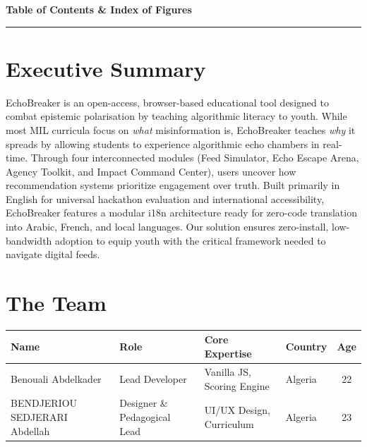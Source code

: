 \documentclass[11pt, a4paper]{article}
\begin{document}
\newpage
{}

\begin{center}
  {\large\bfseries\color{echored} Table of Contents \& Index of Figures}
\end{center}
\vspace{-4pt}

\tableofcontents

\vspace{12pt}
\textcolor{echoborder}{\rule{\linewidth}{0.5pt}}
\vspace{6pt}

{}
\listoffigures

\newpage

\section{Executive Summary}

EchoBreaker is an open-access, browser-based educational tool designed to combat epistemic polarisation by teaching algorithmic literacy to youth. While most MIL curricula focus on \emph{what} misinformation is, EchoBreaker teaches \emph{why} it spreads by allowing students to experience algorithmic echo chambers in real-time. Through four interconnected modules (Feed Simulator, Echo Escape Arena, Agency Toolkit, and Impact Command Center), users uncover how recommendation systems prioritize engagement over truth. Built primarily in English for universal hackathon evaluation and international accessibility, EchoBreaker features a modular i18n architecture ready for zero-code translation into Arabic, French, and local languages. Our solution ensures zero-install, low-bandwidth adoption to equip youth with the critical framework needed to navigate digital feeds.

\section{The Team}

\begin{center}
\renewcommand{\arraystretch}{1.2}
\begin{tabularx}{\textwidth}{p{4.8cm} p{3.8cm} X l c}
\toprule
\textbf{Name} & \textbf{Role} & \textbf{Core Expertise} & \textbf{Country} & \textbf{Age} \\
\midrule
Benouali Abdelkader & Lead Developer & Vanilla JS, Scoring Engine & Algeria & 22 \\
BENDJERIOU SEDJERARI Abdellah & Designer \& Pedagogical Lead & UI/UX Design, Curriculum & Algeria & 23 \\
\bottomrule
\end{tabularx}
\end{center}
\end{document}
